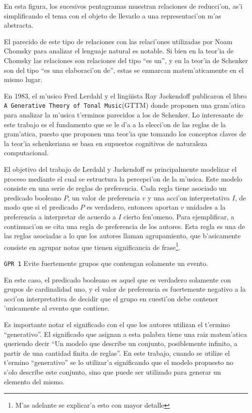 En esta figura, los sucesivos pentagramas muestran relaciones de reducci'on, as'i simplificando el tema con el objeto de llevarlo a una representaci'on m'as abstracta.

El parecido de este tipo de relaciones con las relaci'ones utilizadas por Noam Chomsky para analizar el lenguaje natural es notable. 
Si bien en la teor'ia de Chomsky las relaciones son relaciones del tipo ``es un'', y en la teor'ia de Schenker son del tipo ``es una elaboraci'on de'', 
estas se enmarcan matem'aticamente en el mismo lugar.  

En 1983, el m'usico Fred Lerdahl y el ling\"uista Ray Jackendoff publicaron el libro 
\texttt{A Generative Theory of Tonal Music}(GTTM) donde proponen una gram'atica para analizar la m'usica t'erminos parecidos a los de Schenker. 
Lo interesante de este trabajo es el fundamento que se le d'a a la elecci'on de las reglas de la gram'atica, puesto que proponen una teor'ia que 
tomando los conceptos claves de la teor'ia schenkeriana se basa en supuestos cognitivos de naturaleza computacional.

El objetivo del trabajo de Lerdahl y Jackendoff es principalmente modelizar el proceso mediante el cual se estructura la percepci'on de la m'usica. 
Este modelo consiste en una serie de reglas de preferencia. Cada regla tiene asociado un predicado booleano $P$, un valor de preferencia $v$ y una acci'on interpretativa 
$I$, de modo que si el predicado $P$ es verdadero, entonces aportan $v$ unidades a la preferencia a interpretar de acuerdo a $I$ cierto fen'omeno. 
Para ejemplificar, a continuaci'on se cita una regla de preferencia de los autores. Esta regla es una de las reglas asociadas a lo que los autores 
llaman agrupamiento, que b'asicamente consiste en agrupar notas que tienen significancia de frase\footnote{M'as adelante se explicar'a esto con mayor detalle}.
\newline

\begin{center}
\texttt{GPR 1} Evite fuertemente grupos que contengan solamente un evento.
\end{center}

En este caso, el predicado booleano es aquel que es verdadero solamente con grupos de cardinalidad uno, y el valor de preferencia es fuertemente negativo a la acci'on interpretativa
de decidir que el grupo en cuesti'on debe contener 'unicamente al evento que contiene. 

Es importante notar el significado con el que los autores utilizan el t'ermino ``generativo''\citep[p. 6]{LerdahlJackendoff83}. El significado que asignan 
a esta palabra tiene una raiz matem'atica queriendo decir ``Un modelo que describe un conjunto, posiblemente infinito, a partir
de una cantidad finita de reglas''. En este trabajo, cuando se utilize el t'ermino ``generativo'' se lo utilizar'a significando que el modelo propuesto
no s'olo describe este conjunto, sino que puede ser utilizado para generar un elemento del mismo.

